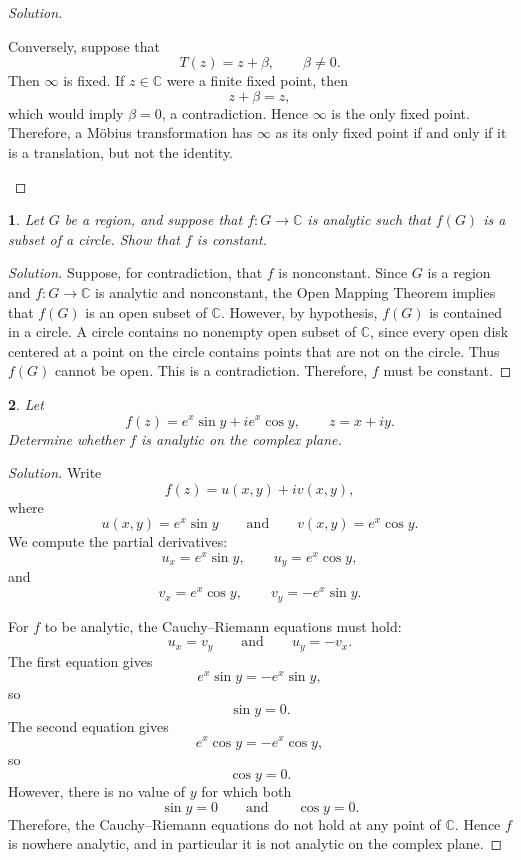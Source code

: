 \documentclass[12pt, a4paper]{report}
\theoremstyle{spaced}
\newtheorem{exercise}{}
\begin{document}
\begin{proof}[Solution]
\begin{enumerate}[(a)]
		      Conversely, suppose that
		      \[
			      T(z)=z+\beta,
			      \qquad \beta\neq 0.
		      \]
		      Then $\infty$ is fixed. If $z\in\mathbb{C}$ were a finite fixed point, then
		      \[
			      z+\beta=z,
		      \]
		      which would imply $\beta=0$, a contradiction. Hence $\infty$ is the only fixed point.
		      Therefore, a M\"obius transformation has $\infty$ as its only fixed point if and only if it is a translation, but not the identity.
	\end{enumerate}
\end{proof}

\begin{exercise}
	Let $G$ be a region, and suppose that $f\colon G\to\mathbb{C}$ is analytic such that $f(G)$ is a subset of a circle. Show that $f$ is constant.
\end{exercise}
\begin{proof}[Solution]
	Suppose, for contradiction, that $f$ is nonconstant. Since $G$ is a region and
	$f\colon G\to\mathbb{C}$ is analytic and nonconstant, the Open Mapping Theorem
	implies that $f(G)$ is an open subset of $\mathbb{C}$.
	However, by hypothesis, $f(G)$ is contained in a circle. A circle contains no
	nonempty open subset of $\mathbb{C}$, since every open disk centered at a point
	on the circle contains points that are not on the circle. Thus $f(G)$ cannot
	be open.
	This is a contradiction. Therefore, $f$ must be constant.
\end{proof}

\begin{exercise}
	Let
	\[
		f(z)=e^x\sin y+i e^x\cos y,
		\qquad z=x+iy.
	\]
	Determine whether $f$ is analytic on the complex plane.
\end{exercise}
\begin{proof}[Solution]
	Write
	\[
		f(z)=u(x,y)+iv(x,y),
	\]
	where
	\[
		u(x,y)=e^x\sin y
		\qquad\text{and}\qquad
		v(x,y)=e^x\cos y.
	\]
	We compute the partial derivatives:
	\[
		u_x=e^x\sin y,
		\qquad
		u_y=e^x\cos y,
	\]
	and
	\[
		v_x=e^x\cos y,
		\qquad
		v_y=-e^x\sin y.
	\]

	For $f$ to be analytic, the Cauchy--Riemann equations must hold:
	\[
		u_x=v_y
		\qquad\text{and}\qquad
		u_y=-v_x.
	\]
	The first equation gives
	\[
		e^x\sin y=-e^x\sin y,
	\]
	so
	\[
		\sin y=0.
	\]
	The second equation gives
	\[
		e^x\cos y=-e^x\cos y,
	\]
	so
	\[
		\cos y=0.
	\]
	However, there is no value of $y$ for which both
	\[
		\sin y=0
		\qquad\text{and}\qquad
		\cos y=0.
	\]
	Therefore, the Cauchy--Riemann equations do not hold at any point of
	$\mathbb{C}$. Hence $f$ is nowhere analytic, and in particular it is not
	analytic on the complex plane.
\end{proof}
\end{document}
